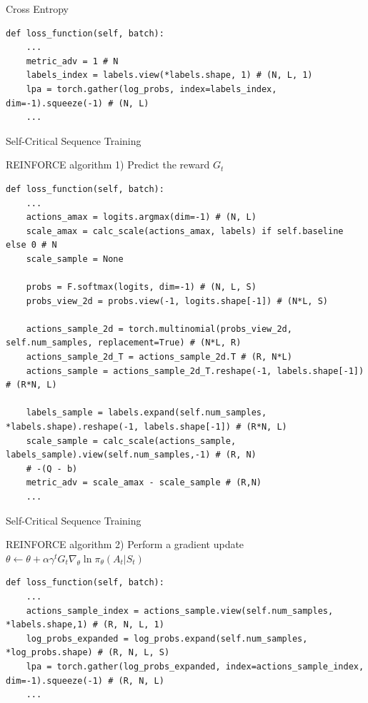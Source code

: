 \documentclass[aspectratio=169,xcolor=dvipsnames]{beamer}
\begin{document}
\begin{frame}[fragile]{Cross Entropy}
\begin{verbatim}
def loss_function(self, batch):
    ...
    metric_adv = 1 # N
    labels_index = labels.view(*labels.shape, 1) # (N, L, 1)
    lpa = torch.gather(log_probs, index=labels_index, dim=-1).squeeze(-1) # (N, L)
    ...
\end{verbatim}
\end{frame}
\begin{frame}[fragile]{Self-Critical Sequence Training}
\begin{block}{REINFORCE algorithm}
1) Predict the reward $G_t$\ \cite{weng_policy_2018}
\end{block}
\begin{verbatim}
def loss_function(self, batch):
    ...
    actions_amax = logits.argmax(dim=-1) # (N, L)
    scale_amax = calc_scale(actions_amax, labels) if self.baseline else 0 # N
    scale_sample = None
    
    probs = F.softmax(logits, dim=-1) # (N, L, S)
    probs_view_2d = probs.view(-1, logits.shape[-1]) # (N*L, S)

    actions_sample_2d = torch.multinomial(probs_view_2d, self.num_samples, replacement=True) # (N*L, R)
    actions_sample_2d_T = actions_sample_2d.T # (R, N*L)
    actions_sample = actions_sample_2d_T.reshape(-1, labels.shape[-1]) # (R*N, L)

    labels_sample = labels.expand(self.num_samples, *labels.shape).reshape(-1, labels.shape[-1]) # (R*N, L)
    scale_sample = calc_scale(actions_sample, labels_sample).view(self.num_samples,-1) # (R, N)
    # -(Q - b)
    metric_adv = scale_amax - scale_sample # (R,N)
    ...
\end{verbatim}
\end{frame}
\begin{frame}[fragile]{Self-Critical Sequence Training}
    \begin{block}{REINFORCE algorithm}
        2) Perform a gradient update $\theta \leftarrow \theta + \alpha \gamma^t G_t \nabla_\theta \ln \pi_\theta(A_t \vert S_t)$\ \cite{weng_policy_2018}
    \end{block}
\begin{verbatim}
def loss_function(self, batch):
    ...
    actions_sample_index = actions_sample.view(self.num_samples, *labels.shape,1) # (R, N, L, 1)
    log_probs_expanded = log_probs.expand(self.num_samples, *log_probs.shape) # (R, N, L, S)
    lpa = torch.gather(log_probs_expanded, index=actions_sample_index, dim=-1).squeeze(-1) # (R, N, L)
    ...
\end{verbatim}
\end{frame}
\end{document}
